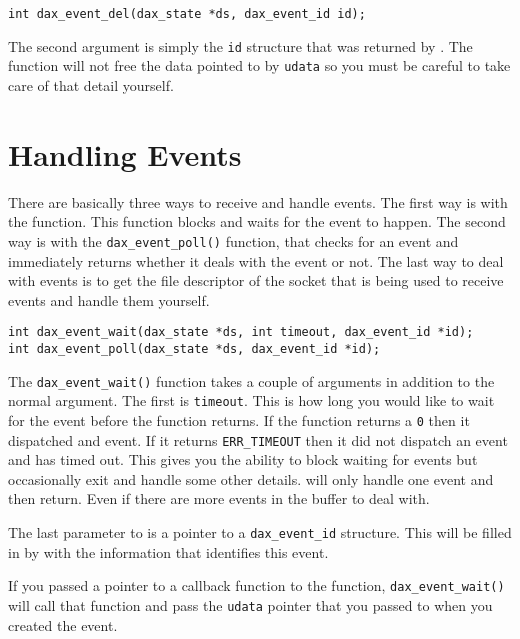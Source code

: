 \begin{verbatim}
int dax_event_del(dax_state *ds, dax_event_id id);
\end{verbatim}

The second argument is simply the \texttt{id} structure that was returned by \eventadd.  The \eventdel function will not free the data pointed to by \texttt{udata} so you must be careful to take care of that detail yourself.

\section{Handling Events}

There are basically three ways to receive and handle events.  The first way is with the \eventwait function.  This function blocks and waits for the event to happen.  The second way is with the \verb|dax_event_poll()| function, that checks for an event and immediately returns whether it deals with the event or not.  The last way to deal with events is to get the file descriptor of the socket that is being used to receive events and handle them yourself.

\begin{verbatim}
int dax_event_wait(dax_state *ds, int timeout, dax_event_id *id);
int dax_event_poll(dax_state *ds, dax_event_id *id);
\end{verbatim}


The \texttt{dax\_event\_wait()} function takes a couple of arguments in addition to the normal \daxstate argument.  The first is \texttt{timeout}.  This is how long you would like to wait for the event before the function returns.  If the function returns a \verb|0| then it dispatched and event.  If it returns \texttt{ERR\_TIMEOUT} then it did not dispatch an event and has timed out.  This gives you the ability to block waiting for events but occasionally exit and handle some other details.  \eventwait will only handle one event and then return.  Even if there are more events in the buffer to deal with.

The last parameter to \eventwait is a pointer to a \texttt{dax\_event\_id} structure.  This will be filled in by \eventwait with the information that identifies this event.

If you passed a pointer to a callback function to the \eventadd function, \verb|dax_event_wait()| will call that function and pass the \texttt{udata} pointer that you passed to \eventadd when you created the event.  

